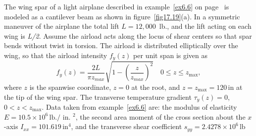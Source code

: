 \documentclass{AeroStructure-ERJohnson}
\begin{document}
\begin{example}\label{ex17.5}The wing spar of a light airplane described in example~\ref{ex6.6} on page~\pageref{ex6.6} is modeled as a cantilever beam as shown in figure~\ref{fig17.19}(a). In a symmetric maneuver of the airplane the total lift $L=12{,}000$~lb., and the lift acting on each wing is \textit{L/2}. Assume the airload acts along the locus of shear centers so that spar bends without twist in torsion. The airload is distributed elliptically over the wing, so that the airload intensity $f_{y}(z)$ per unit span is given as
{\def\thefigure{17.19}
}
\begin{equation}
f_{y}(z)=\frac{2 L}{\pi z_{m a x}} \sqrt{1-\left(\frac{z}{z_{m a x}}\right)^{2}} \quad 0 \leq z \leq z_{\max}, \label{eq17.5.a}\tag{a}
\end{equation}
where $z$ is the spanwise coordinate, $z=0$ at the root, and $z=z_{\max}=120\,\mathrm{in}$ at the tip of the wing spar. The transverse temperature gradient $\tau_{y}(z)=0$, $0<z<z_{\max}$. Data taken from example~\ref{ex6.6} are: the modulus of elasticity $E=10.5 \times 10^{6}\,\mathrm{lb}./\text { in. }^{2}$, the second area moment of the cross section about the $x$-axis $I_{x x}=101.619\,\mathrm{in}^{4}$, and the transverse shear coefficient $s_{y y}=2.4278 \times 10^{6}\,\mathrm{lb}$


\end{example}
\end{document}
